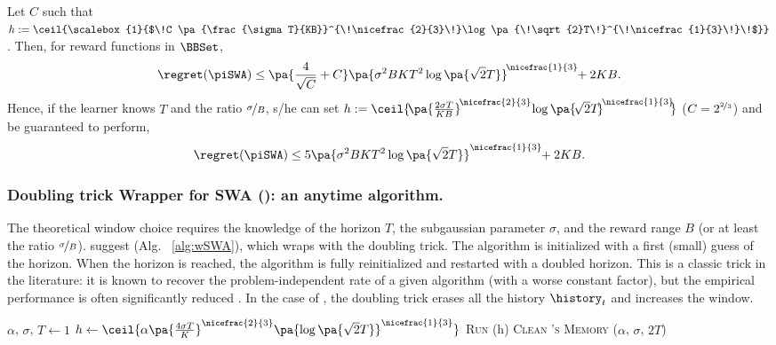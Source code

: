 \begin{corollary}
\label{cor:SWA}
\newcommand*{\Scale}[2][4]{\scalebox{#1}{$#2$}} Let $C$ such that $h:= \ceil{\Scale[1]{\!C \pa{\frac{\sigma T}{KB}}^{\!\nicefrac{2}{3}\!}\log\pa{\!\sqrt{2}T\!}^{\!\nicefrac{1}{3}\!}\!}}$. Then, for reward functions in $\BBSet$,
\[
\regret(\piSWA) \leq \pa{\frac{4}{\sqrt{C}} + C} \pa{\sigma^2 B K T^2 \log\pa{\sqrt{2}T}}^{\!\nicefrac{1}{3}\!} \!+ 2KB. 
\]
%
Hence, if the learner knows $T$ and the ratio $\nicefrac{\sigma}{B}$, s/he can set $h:= \ceil{\!\pa{\frac{2\sigma T}{KB}}^{\!\nicefrac{2}{3}\!}\log\pa{\!\sqrt{2}T\!}^{\!\nicefrac{1}{3}\!}\!}$ (\ie $C=2^{\nicefrac{2}{3}}$) and be guaranteed to perform,
\[
\regret(\piSWA) \leq 5 \pa{\sigma^2 B K T^2 \log\pa{\sqrt{2}T}}^{\nicefrac{1}{3}\!} \!+ 2KB. 
\]
%
\end{corollary}

\subsubsection*{Doubling trick Wrapper for SWA ({\wSWA}): an anytime algorithm.}
The theoretical window choice requires the knowledge of the horizon $T$, the subgaussian parameter $\sigma$, and the reward range $B$ (or at least the ratio $\nicefrac{\sigma}{B}$).  \citet{levine2017rotting} suggest \wSWA (Alg. ~\ref{alg:wSWA}), which wraps \SWA with the doubling trick. The algorithm is initialized with a first (small) guess of the horizon. When the horizon is reached, the algorithm is fully reinitialized and restarted with a doubled horizon. This is a classic trick in the literature: it is known to recover the problem-independent rate of a given algorithm (with a worse constant factor), but the empirical performance is often significantly reduced \citep{besson2018doubling}. In the case of \wSWA, the doubling trick erases all the history $\history_t$ and increases the window. 

\begin{algorithm}[!h]
\caption{{\wSWA} \citep{levine2017rotting} }
\label{alg:wSWA}
\begin{algorithmic}[1]
\Require $\alpha$, $\sigma$, $T \gets 1$
\State $h \gets \ceil{\alpha\pa{\frac{4\sigma T}{K}}^{\nicefrac{2}{3}}\pa{\log\pa{\sqrt{2}T}}^{\nicefrac{1}{3}}}$
		\State \textsc{Run} \SWA(h)
	\EndFor
\State \textsc{Clean \SWA's \textsc{Memory}}\label{algline:wSWA-clean}
\State \wSWA($\alpha$, $\sigma$, $2T$) 
\end{algorithmic}
\end{algorithm}

